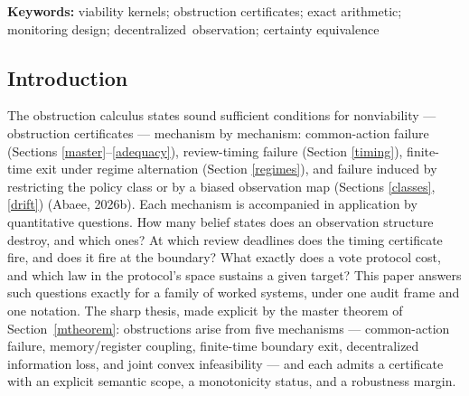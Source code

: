 \documentclass[10pt,twocolumn]{article}
\theoremstyle{definition}
\begin{document}
\begin{abstract}
operation loses exactly the pairs containing the corner state
\((1,1)\). The biased certainty-equivalence law has
drift at least \(21/100\) on \([1,2]\); the bias-free law has drift
identically zero. The benchmark's critical aggregate is \(Y^{*} = 27/5\) (feasible,
margin \(0\)); at the audited obstructed aggregate \(Y = 6\) a
rational dual certificate prices the shortfall at margin \(3/50\). Static duality
holds at value \(-1/10\) on the two-floor instance with an \(\ell_1\)-normalized
Farkas pair, and a Helly-tight triple exhibits the sparse \(m{+}1\)-constraint witness. The complete result tables are carried here: the master table
of all 36 belief pairs against the five kernels, the sixteen sustaining
law pairs of the decentralized protocol (an exact \(4 \times 4\)
product), the 93-cell timing grid, the fifteen-partition census with
each fibre's common safe-action set, and the benchmark and drift tables,
with a five-figure set regenerated from the same scripts. Design rules
follow: review deadlines are boundary-inclusive; merged fibres call for
splits, not threshold tuning; aggregated indices support certainly-safe
reporting only; biased observation maps call for structural correction.
\end{abstract}

\textbf{Keywords:} viability kernels; obstruction certificates; exact
arithmetic; monitoring design; \mbox{decentralized observation}; certainty
equivalence

\subsection{Introduction}\label{introduction}

The obstruction calculus states sound sufficient conditions for
nonviability --- obstruction certificates --- mechanism by mechanism:
common-action failure (Sections \ref{master}--\ref{adequacy}),
review-timing failure (Section \ref{timing}), finite-time exit under
regime alternation (Section \ref{regimes}), and failure induced by
restricting the policy class or by a biased observation map
(Sections \ref{classes}, \ref{drift}) (Abaee, 2026b). Each mechanism is
accompanied in application by quantitative questions. How many belief
states does an observation structure destroy, and which ones? At which
review deadlines does the timing certificate fire, and does it fire at
the boundary? What exactly does a vote protocol cost, and which law in
the protocol's space sustains a given target? This paper answers such
questions exactly for a family of worked systems, under one audit frame
and one notation. The sharp thesis, made explicit by the master
theorem of Section~\ref{mtheorem}: obstructions arise from five
mechanisms --- common-action failure, memory/register coupling,
finite-time boundary exit, decentralized information loss, and joint
convex infeasibility --- and each admits a certificate with an explicit
semantic scope, a monotonicity status, and a robustness margin.
\end{document}
